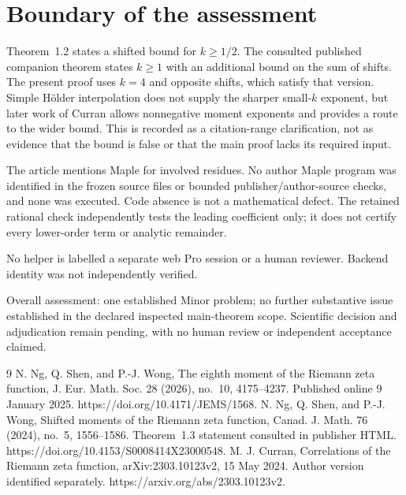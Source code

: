 \documentclass[10pt]{article}
\begin{document}
\section*{Boundary of the assessment}
Theorem 1.2 states a shifted bound for \(k\ge1/2\). The consulted published companion theorem states \(k\ge1\) with an additional bound on the sum of shifts. The present proof uses \(k=4\) and opposite shifts, which satisfy that version. Simple Hölder interpolation does not supply the sharper small-\(k\) exponent, but later work of Curran allows nonnegative moment exponents and provides a route to the wider bound. This is recorded as a citation-range clarification, not as evidence that the bound is false or that the main proof lacks its required input.\par
The article mentions Maple for involved residues. No author Maple program was identified in the frozen source files or bounded publisher/author-source checks, and none was executed. Code absence is not a mathematical defect. The retained rational check independently tests the leading coefficient only; it does not certify every lower-order term or analytic remainder.\par
No helper is labelled a separate web Pro session or a human reviewer. Backend identity was not independently verified.\par
Overall assessment: one established Minor problem; no further substantive issue established in the declared inspected main-theorem scope. Scientific decision and adjudication remain pending, with no human review or independent acceptance claimed.\par
9 N. Ng, Q. Shen, and P.-J. Wong, The eighth moment of the Riemann zeta function, J. Eur. Math. Soc. 28 (2026), no. 10, 4175–4237. Published online 9 January 2025. https://doi.org/10.4171/JEMS/1568. N. Ng, Q. Shen, and P.-J. Wong, Shifted moments of the Riemann zeta function, Canad. J. Math. 76 (2024), no. 5, 1556–1586. Theorem 1.3 statement consulted in publisher HTML. https://doi.org/10.4153/S0008414X23000548. M. J. Curran, Correlations of the Riemann zeta function, arXiv:2303.10123v2, 15 May 2024. Author version identified separately. https://arxiv.org/abs/2303.10123v2.\par
\end{document}
